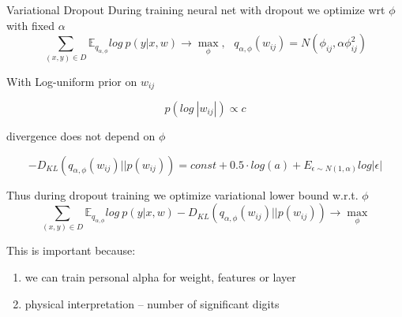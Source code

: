 \documentclass{beamer}
\begin{document}
\begin{frame}{Variational Dropout}
	During training neural net with dropout we optimize wrt $\phi$ with fixed $\alpha$
	$$\sum_{(x, y) \in D}\mathds{E}_{q_{\alpha, \phi}} log~p(y|x, w) \rightarrow \max_{\phi},~~~q_{\alpha, \phi}(w_{ij}) = N(\phi_{ij}, \alpha\phi_{ij}^2)$$
	
	With Log-uniform prior on $w_{ij}$
	
	\vspace{-0.3cm}
	$$p(log~|w_{ij}|) \propto c$$
	
	divergence does not depend on $\phi$
	
	\vspace{-0.3cm}
	$$- D_{KL}(q_{\alpha, \phi}(w_{ij}) || p(w_{ij})) = const + 0.5 \cdot log(a) + E_{\epsilon \sim N(1, \alpha)}log |\epsilon|$$
	
	Thus during dropout training we optimize variational lower bound w.r.t. $\phi$
	$$\sum_{(x, y) \in D}\mathds{E}_{q_{\alpha, \phi}} log~p(y|x, w) - D_{KL}(q_{\alpha, \phi}(w_{ij}) || p(w_{ij})) \rightarrow \max_{\phi}$$
	\begin{tcolorbox}[enhanced,size=fbox,fontupper=\large\bfseries, colback=black!80, colframe=black!80]
		\begin{center}
			\text{\textcolor{white}{Dropout is the special case of Bayesian Regularization}}
		\end{center}
	\end{tcolorbox}
	
	This is important because:
	\begin{enumerate}
		\item we can train personal alpha for weight, features or layer
		\item physical interpretation -- number of significant digits
	\end{enumerate} 
\end{frame}
\end{document}
